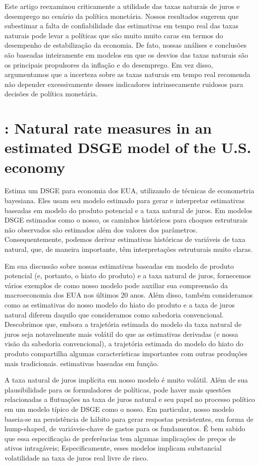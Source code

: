 Este artigo reexaminou criticamente a utilidade das taxas naturais de juros e desemprego no cenário da política monetária. Nossos resultados sugerem que subestimar a falta de confiabilidade das estimativas em tempo real das taxas naturais pode levar a políticas que são muito muito caras em termos do desempenho de estabilização da economia. De fato, nossas análises e conclusões são baseadas inteiramente em modelos em que os desvios das taxas naturais são os principais propulsores da inflação e do desemprego. Em vez disso, argumentamos que a incerteza sobre as taxas naturais em tempo real recomenda não depender excessivamente desses indicadores intrinsecamente ruidosos para decisões de política monetária.
%
%
\section{\citet{Edge:2008}: Natural rate measures in an estimated DSGE model of the U.S. economy  }
Estima um DSGE para economia dos EUA, utilizando de técnicas de econometria bayesiana. Eles usam seu modelo estimado para gerar e interpretar estimativas baseadas em modelo do produto potencial e a taxa natural de juros. Em modelos DSGE estimados como o nosso, os caminhos históricos para choques estruturais não observados são estimados além dos valores dos parâmetros. Consequentemente, podemos derivar estimativas históricas de variáveis de taxa natural, que, de maneira importante, têm interpretações estruturais muito claras.

Em sua discussão sobre nossas estimativas baseadas em modelo de produto potencial (e, portanto, o hiato do produto) e a taxa natural de juros, fornecemos vários exemplos de como nosso modelo pode auxiliar sua compreensão da macroeconomia dos EUA nos últimos 20 anos. Além disso, também consideramos como as estimativas do nosso modelo do hiato do produto e a taxa de juros natural diferem daquilo que consideramos como sabedoria convencional. Descobrimos que, embora a trajetória estimada do modelo da taxa natural de juros seja notavelmente mais volátil do que as estimativas derivadas (e nossa visão da sabedoria convencional), a trajetória estimada do modelo do hiato do produto compartilha algumas características importantes com outras produções mais tradicionais. estimativas baseadas em função.

A taxa natural de juros implícita em nosso modelo é muito volátil. Além de sua plausibilidade para os formuladores de políticas, pode haver mais questões relacionadas a flutuações na taxa de juros natural e seu papel no processo político em um modelo típico de DSGE como o nosso. Em particular, nosso modelo baseia-se na persistência de hábito para gerar respostas persistentes, em forma de hump-shaped, de variáveis-chave de gastos para os fundamentos. É bem sabido que essa especificação de preferências tem algumas implicações de preços de ativos intragáveis; Especificamente, esses modelos implicam substancial volatilidade na taxa de juros real livre de risco.
%
%
